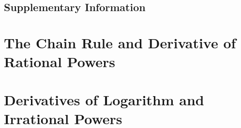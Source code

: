 \documentclass{fts_m2}
\begin{document}
    \subsection*{Supplementary Information}
    

    \section{The Chain Rule and Derivative of Rational Powers}
    

    \section{Derivatives of Logarithm and Irrational Powers}
    

\end{document}
